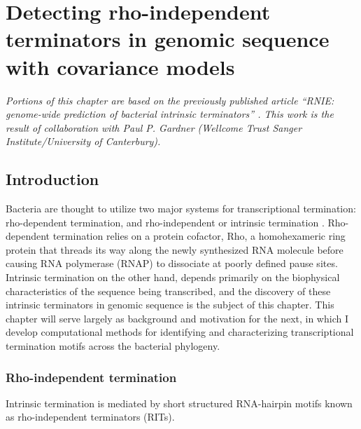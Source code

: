 
\chapter{Detecting rho-independent terminators in genomic sequence with covariance models}
\label{sec:chapterPingpong}
\ifpdf
    \graphicspath{{Chapter4/Chapter4Figs/EPS/}{Chapter4/Chapter4Figs/}}
\fi

\textit{Portions of this chapter are based on the previously published article ``RNIE: genome-wide prediction of bacterial intrinsic terminators'' \parencite{Gardner2011a}. This work is the result of collaboration with Paul P. Gardner (Wellcome Trust Sanger Institute/University of Canterbury). }

\section{Introduction}

Bacteria are thought to utilize two major systems for transcriptional termination: rho-dependent termination, and rho-independent or intrinsic termination \parencite{Peters2011}. Rho-dependent termination relies on a protein cofactor, Rho, a homohexameric ring protein that threads its way along the newly synthesized RNA molecule before causing RNA polymerase (RNAP) to dissociate at poorly defined pause sites. Intrinsic termination on the other hand, depends primarily on the biophysical characteristics of the sequence being transcribed, and the discovery of these intrinsic terminators in genomic sequence is the subject of this chapter. This chapter will serve largely as background and motivation for the next, in which I develop computational methods for identifying and characterizing transcriptional termination motifs across the bacterial phylogeny.

\subsection{Rho-independent termination}

Intrinsic termination is mediated by short structured RNA-hairpin motifs known as rho-independent terminators (RITs). 

